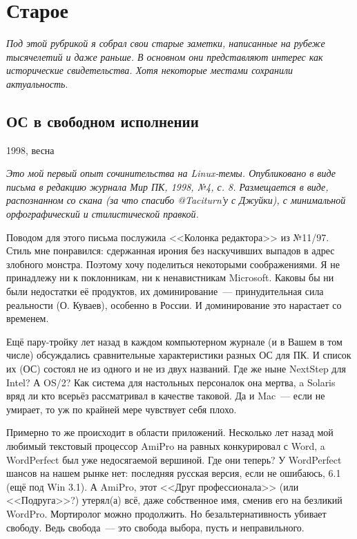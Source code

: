 \chapter{Старое}

\textsl{Под этой рубрикой я собрал свои старые заметки, написанные на рубеже тысячелетий и даже раньше. В основном они представляют интерес как исторические свидетельства. Хотя некоторые местами сохранили актуальность}.

\section{ОС в свободном исполнении} 
\begin{timeline}1998, весна\end{timeline}

\textsl{Это мой первый опыт сочинительства на Linux-темы. Опубликовано в виде письма в редакцию журнала Мир ПК, 1998, №4, с. 8. Размещается в виде, распознанном со скана (за что спасибо @Taciturn'у с Джуйки), с минимальной орфографический и стилистической правкой.}\medskip

Поводом для этого письма послужила <<Колонка редактора>> из №11/97. Стиль мне понравился: сдержанная ирония без наскучивших выпадов в адрес злобного монстра. Поэтому хочу поделиться некоторыми соображениями. Я не принадлежу ни к поклонникам, ни к ненавистникам Microsoft. Каковы бы ни были недостатки её продуктов, их доминирование~--- принудительная сила реальности (О. Куваев), особенно в России. И доминирование это нарастает со временем.

Ещё пару-тройку лет назад в каждом компьютерном журнале (и в Вашем в том числе) обсуждались сравнительные характеристики разных ОС для ПК. И список их (ОС) состоял не из одного и не из двух названий. Где же ныне NextStep для Intel? А OS/2? Как система для настольных персоналок она мертва, a Solaris вряд ли кто всерьёз рассматривал в качестве таковой. Да и Mac~--- если не умирает, то уж по крайней мере чувствует себя плохо.

Примерно то же происходит в области приложений. Несколько лет назад мой любимый текстовый процессор AmiPro на равных конкурировал с Word, a WordPerfect был уже недосягаемой вершиной. Где они теперь? У WordPerfect шансов на нашем рынке нет: последняя русская версия, если не ошибаюсь, 6.1 (ещё под Win 3.1). А AmiPro, этот <<Друг профессионала>> (или <<Подруга>>?) утерял(а) всё, даже собственное имя, сменив его на безликий WordPro. Мортиролог можно продолжить. Но безальтернативность убивает свободу. Ведь свобода~--- это свобода выбора, пусть и неправильного.

